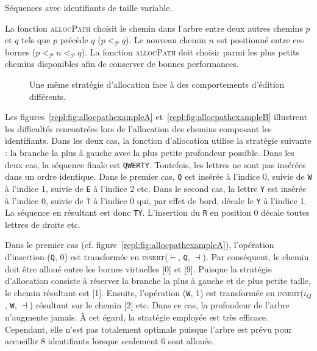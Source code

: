 \begin{algorithm}[h]
  
  \caption[Séquences avec identifiants de taille variable]
  {\label{repl:algo:general}Séquences avec identifiants de taille variable.}
\end{algorithm}

La fonction \textsc{allocPath} choisit le chemin dans l'arbre entre deux autres
chemins $p$ et $q$ tels que $p$ précède $q$ ($p <_\mathcal{P} q$). Le nouveau
chemin $n$ est positionné entre ces bornes
($p <_\mathcal{P} n <_\mathcal{P} q$). La fonction \textsc{allocPath} doit
choisir parmi les plus petits chemins disponibles afin de conserver de bonnes
performances.

\begin{figure}
  \begin{center}
  \hspace{30pt}
  \end{center}
  \caption[Une stratégie d'allocation contre les comportements d'édition] {Une
    même stratégie d'allocation face à des comportements d'édition différents.}
\end{figure}

Les figures~\ref{repl:fig:allocpathexampleA} et~\ref{repl:fig:allocpathexampleB}
illustrent les difficultés rencontrées lors de l'allocation des chemins
composant les identifiants. Dans les deux cas, la fonction d'allocation utilise
la stratégie suivante : la branche la plus à gauche avec la plus petite
profondeur possible. Dans les deux cas, la séquence finale est
\texttt{QWERTY}. Toutefois, les lettres ne sont pas insérées dans un ordre
identique. Dans le premier cas, \texttt{Q} est insérée à l'indice 0, suivie de
\texttt{W} à l'indice 1, suivie de \texttt{E} à l'indice 2 etc.  Dans le second
cas, la lettre \texttt{Y} est insérée à l'indice 0, suivie de \texttt{T} à
l'indice 0 qui, par effet de bord, décale le \texttt{Y} à l'indice 1. La
séquence en résultant est donc \texttt{TY}. L'insertion du \texttt{R} en
position 0 décale toutes lettres de droite etc.

Dans le premier cas (cf. figure~\ref{repl:fig:allocpathexampleA}), l'opération
d'insertion (\texttt{Q}, 0) est transformée en \textsc{insert}($\vdash$,
\texttt{Q}, $\dashv$). Par conséquent, le chemin doit être alloué entre les
bornes virtuelles [0] et [9]. Puisque la stratégie d'allocation consiste à
réserver la branche la plus à gauche et de plus petite taille, le chemin
résultant est [1]. Ensuite, l'opération (\texttt{W}, 1) est transformée en
\textsc{insert}($i_Q$, \texttt{W}, $\dashv$) résultant sur le chemin [2] etc.
Dans ce cas, la profondeur de l'arbre n'augmente jamais. À cet égard, la
stratégie employée est très efficace. Cependant, elle n'est pas totalement
optimale puisque l'arbre est prévu pour accueillir 8 identifiants lorsque
seulement 6 sont alloués.

